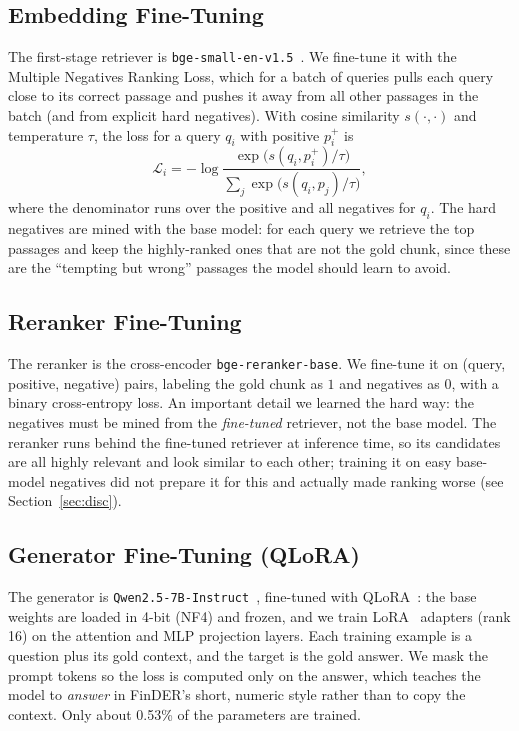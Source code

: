 \documentclass[conference]{IEEEtran}
\begin{document}
\subsection{Embedding Fine-Tuning}
The first-stage retriever is \texttt{bge-small-en-v1.5}~\cite{xiao2023bge}. We fine-tune it with the
Multiple Negatives Ranking Loss, which for a batch of queries pulls each query close to its correct
passage and pushes it away from all other passages in the batch (and from explicit hard negatives). With
cosine similarity $s(\cdot,\cdot)$ and temperature $\tau$, the loss for a query $q_i$ with positive
$p_i^{+}$ is
\begin{equation}
\mathcal{L}_i = -\log \frac{\exp\!\big(s(q_i, p_i^{+})/\tau\big)}
{\sum_{j} \exp\!\big(s(q_i, p_j)/\tau\big)},
\end{equation}
where the denominator runs over the positive and all negatives for $q_i$. The hard negatives are mined
with the base model: for each query we retrieve the top passages and keep the highly-ranked ones that are
not the gold chunk, since these are the ``tempting but wrong'' passages the model should learn to avoid.

\subsection{Reranker Fine-Tuning}
The reranker is the cross-encoder \texttt{bge-reranker-base}. We fine-tune it on (query, positive,
negative) pairs, labeling the gold chunk as $1$ and negatives as $0$, with a binary cross-entropy loss.
An important detail we learned the hard way: the negatives must be mined from the \emph{fine-tuned}
retriever, not the base model. The reranker runs behind the fine-tuned retriever at inference time, so
its candidates are all highly relevant and look similar to each other; training it on easy base-model
negatives did not prepare it for this and actually made ranking worse (see Section~\ref{sec:disc}).

\subsection{Generator Fine-Tuning (QLoRA)}
The generator is \texttt{Qwen2.5-7B-Instruct}~\cite{qwen2024}, fine-tuned with QLoRA~\cite{dettmers2023qlora}:
the base weights are loaded in 4-bit (NF4) and frozen, and we train LoRA~\cite{hu2021lora} adapters
(rank 16) on the attention and MLP projection layers. Each training example is a question plus its gold
context, and the target is the gold answer. We mask the prompt tokens so the loss is computed only on the
answer, which teaches the model to \emph{answer} in FinDER's short, numeric style rather than to copy the
context. Only about 0.53\% of the parameters are trained.
\end{document}
